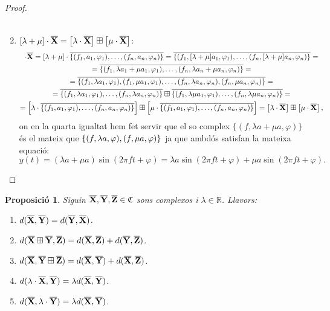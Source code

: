 \documentclass{article}
\theoremstyle{math}
\newtheorem{prop}[definition]{Proposició}
\newcommand{\0}{\ensuremath{\vb{0}}}
\newcommand{\X}{\ensuremath{\vb{X}}}
\newcommand{\Y}{\ensuremath{\vb{Y}}}
\newcommand{\Z}{\ensuremath{\vb{Z}}}
\newcommand{\RR}{\ensuremath{\mathbb{R}}} %
\begin{document}
\begin{proof}
\begin{enumerate}
\begin{multline*}
        \end{multline*}
        \item $[\lambda+\mu]\cdot\overline{\X}=\left[\lambda \cdot \overline{\X}\right] \boxplus\left[\mu \cdot \overline{\X}\right]$:
        \begin{multline*}
            [\lambda+\mu]\cdot \overline{\X}=[\lambda+\mu]\cdot\overline{\{(f_1,a_1,\varphi_1),\ldots,(f_n,a_n,\varphi_n)\}}=\overline{\{(f_1,[\lambda+\mu]a_1,\varphi_1),\ldots,(f_n,[\lambda+\mu]a_n,\varphi_n)\}}=\\=\overline{\{(f_1,\lambda a_1+\mu a_1,\varphi_1),\ldots,(f_n,\lambda a_n+\mu a_n,\varphi_n)\}}=\\=\overline{\{(f_1,\lambda a_1,\varphi_1),(f_1,\mu a_1,\varphi_1),\ldots,(f_n,\lambda a_n,\varphi_n),(f_n,\mu a_n,\varphi_n)\}}=\\=\overline{\{(f_1,\lambda a_1,\varphi_1),\ldots,(f_n,\lambda a_n,\varphi_n)\}}\boxplus\overline{\{(f_1,\lambda\mu a_1,\varphi_1),\ldots,(f_n,\lambda\mu a_n,\varphi_n)\}}=\\=\left[\lambda\cdot\overline{\{(f_1,a_1,\varphi_1),\ldots,(f_n,a_n,\varphi_n)\}}\right]\boxplus\left[\mu\cdot\overline{\{(f_1,a_1,\varphi_1),\ldots,(f_n,a_n,\varphi_n)\}}\right]=\left[\lambda \cdot \overline{\X}\right] \boxplus\left[\mu \cdot \overline{\X}\right],
        \end{multline*}
        on en la quarta igualtat hem fet servir que el so complex $\{(f,\lambda a+\mu a,\varphi)\}$ és el mateix que $\{(f,\lambda a,\varphi),\\(f,\mu a,\varphi)\}$ ja que ambdós satisfan la mateixa equació: $$y(t)=(\lambda a+\mu a)\sin(2\pi ft+\varphi)=\lambda a\sin(2\pi ft+\varphi)+\mu a\sin(2\pi ft+\varphi).$$
    \end{enumerate}
\end{proof}
\begin{prop}
    Siguin $\overline{\X},\overline{\Y},\overline{\Z}\in\mathfrak{C}$ sons complexos i $\lambda\in\RR$. Llavors:
    \begin{enumerate}[label=$d$\arabic*),ref=$d$\arabic*]
        \item\label{dd1} $d(\overline{\X},\overline{\Y})=d(\overline{\Y},\overline{\X})$.
        \item\label{dd2} $d(\overline{\X}\boxplus\overline{\Y},\overline{\Z})=d(\overline{\X},\overline{\Z})+d(\overline{\Y},\overline{\Z})$.
        \item\label{dd3} $d(\overline{\X},\overline{\Y}\boxplus\overline{\Z})=d(\overline{\X},\overline{\Y})+d(\overline{\X},\overline{\Z})$.
        \item\label{dd4} $d(\lambda\cdot\overline{\X},\overline{\Y})=\lambda d(\overline{\X},\overline{\Y})$.
        \item\label{dd5} $d(\overline{\X},\lambda\cdot\overline{\Y})=\lambda d(\overline{\X},\overline{\Y})$.
    \end{enumerate}
\end{prop}
\end{document}
